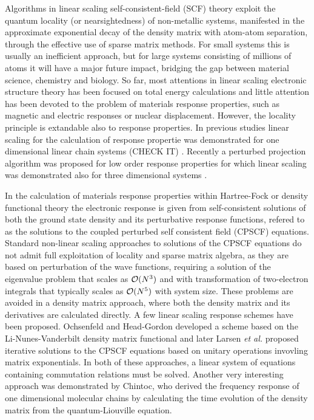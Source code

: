 \documentclass[prl,aps,twocolumn,showpacs,twocolumngrid,superbib]{revtex4}
\begin{document}
 Algorithms in linear scaling self-consistent-field (SCF) theory 
 exploit the quantum locality (or nearsightedness) of non-metallic systems, 
 manifested in the approximate exponential decay of the density matrix 
 with atom-atom separation, through the effective use of sparse 
 matrix methods. For small systems this is usually an inefficient
 approach, but for large systems consisting of millions
 of atoms it will have a major future impact, bridging the gap
 between material science, chemistry and biology. So far, most 
 attentions in linear scaling electronic structure
 theory has been focused on total energy calculations and little
 attention has been devoted to the problem of materials response
 properties, such as magnetic and electric responses or nuclear
 displacement. However, the locality principle is extandable
 also to response properties. In previous studies linear scaling 
 for the calculation of response propertie was demonstrated for one
 dimensional linear chain systems (CHECK IT)
 \cite{Ochsenfeld_1997,Ochsenfeld_1998,chintoc}. Recently
 a perturbed projection algorithm was proposed for low order
 response properties for which linear scaling was demonstrated
 also for three dimensional systems \cite{Weber_Niklasson_Challacombe_2004}.

 In the calculation of materials response properties within 
 Hartree-Fock or density functional theory the electronic
 response is given from self-consistent solutions of both
 the ground state density and its perturbative response functions,
 refered to as the solutions to the coupled perturbed self consistent 
 field (CPSCF) equations.
 Standard non-linear scaling approaches to solutions of the CPSCF equations 
 \cite{Pople_1979,Sekino_1986,Dupuis_1991} do not admit full exploitation 
 of locality and sparse matrix algebra, as they are based on perturbation 
 of the wave functions, requiring a solution of the eigenvalue problem
 that scales as ${\cal O}(N^3)$ and with transformation of two-electron
 integrals that typically scales as ${\cal O}(N^5)$ with system size.
 These problems are avoided in a density matrix approach, where both
 the density matrix and its derivatives are calculated directly.
 A few linear scaling response schemes have been proposed.
 Ochsenfeld and Head-Gordon developed a scheme based on the
 Li-Nunes-Vanderbilt density matrix functional \cite{Ochsenfeld_1997}
 and later Larsen {\em et al.} \cite{Helgaker_2001} proposed iterative 
 solutions to the CPSCF equations based on unitary operations
 invovling matrix exponentials. In both of these approaches, a linear 
 system of equations containing commutation relations must be solved.
 Another very interesting approach was demonstrated by Chintoc, who
 derived the frequency response of one dimensional molecular chains
 by calculating the time evolution of the density matrix from
 the quantum-Liouville equation.
\end{document}
